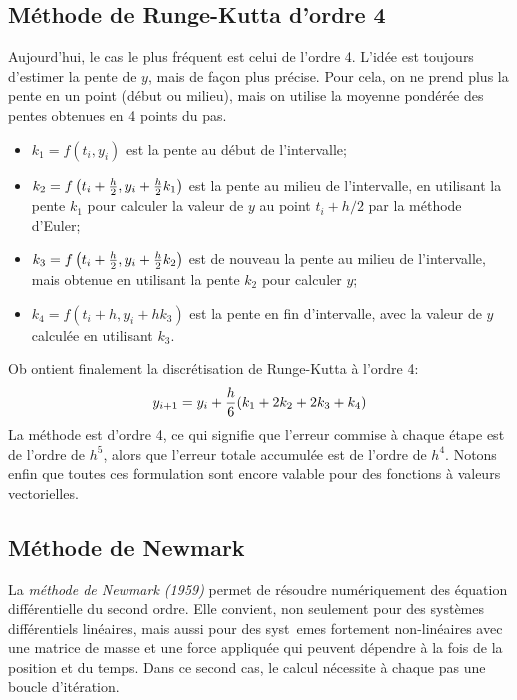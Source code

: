 \subsection{Méthode de Runge-Kutta d'ordre 4} Aujourd'hui, le cas le plus fréquent est celui de l'ordre 4. L'idée est toujours d'estimer la pente de $y$, mais de façon plus précise. Pour cela, on ne prend plus la pente en un point (début ou milieu), mais on utilise la moyenne pondérée des pentes obtenues en 4 points du pas. 
\begin{itemize} 
\item $k_1 = f \left( t_i, y_i \right) $ est la pente au début de l'intervalle; 
\item $k_2 = f \left( t_i + {h \over 2}, y_i + {h\over 2} k_1 \right)$ est la pente au milieu de l'intervalle, en utilisant la pente $k_1$ pour calculer la valeur de $y$ au point $t_i + h/2$ par la méthode d'Euler; 
\item $k_3 = f \left( t_i + {h \over 2}, y_i + {h\over 2} k_2 \right)$ est de nouveau la pente au milieu de l'intervalle, mais obtenue en utilisant la pente $k_2$ pour calculer $y$; 
\item $k_4 = f \left( t_i + h, y_i + h k_3\right)$ est la pente en fin d'intervalle, avec la valeur de $y$ calculée en utilisant $k_3$. 
\end{itemize} 
 Ob ontient finalement la discrétisation de Runge-Kutta à l'ordre 4:
\begin{equation}
y_{i+1} = y_i + {h \over 6} (k_1 + 2k_2 + 2k_3 + k_4)
\end{equation}
La méthode est d'ordre 4, ce qui signifie que l'erreur commise à chaque étape est de l'ordre de $h^5$, alors que l'erreur totale accumulée est de l'ordre de $h^4$. Notons enfin que toutes ces formulation sont encore valable pour des fonctions à valeurs vectorielles. 
 
\subsection{Méthode de Newmark}\label{Sec-Newmark} La \emph{méthode de Newmark (1959)} permet de résoudre numériquement des équation différentielle du second ordre. Elle convient, non seulement pour des systèmes différentiels linéaires, mais aussi pour des syst\ emes fortement non-linéaires avec une matrice de masse et une force appliquée qui peuvent dépendre à la fois de la position et du temps. Dans ce second cas, le calcul nécessite à chaque pas une boucle d'itération. 

